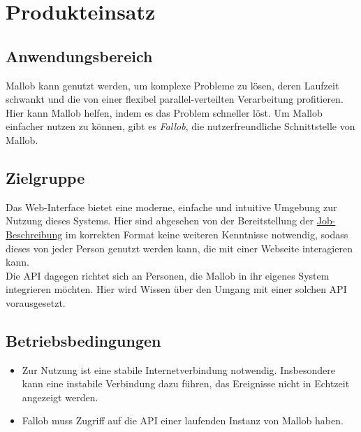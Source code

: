\section{Produkteinsatz}

\subsection{Anwendungsbereich}

\gls{Mallob} kann genutzt werden, um komplexe Probleme zu lösen, deren Laufzeit schwankt und die von einer flexibel parallel-verteilten Verarbeitung profitieren. Hier kann \gls{Mallob} helfen, indem es das Problem schneller löst. Um \gls{Mallob} einfacher nutzen zu können, gibt es \textit{Fallob}, die nutzerfreundliche Schnittstelle von \gls{Mallob}.

\subsection{Zielgruppe}

Das \gls{Web-Interface} bietet eine moderne, einfache und intuitive Umgebung zur Nutzung dieses Systems. Hier sind abgesehen von der Bereitstellung der \hyperref[B:Job-Beschreibung]{Job-Beschreibung} im korrekten Format keine weiteren Kenntnisse notwendig, sodass dieses von jeder Person genutzt werden kann, die mit einer Webseite interagieren  kann.\\
Die \gls{API} dagegen richtet sich an Personen, die \gls{Mallob} in ihr eigenes System integrieren möchten. Hier wird Wissen über den Umgang mit einer solchen \gls{API} vorausgesetzt.

\subsection{Betriebsbedingungen}
\begin{itemize}
    \item Zur Nutzung ist eine stabile Internetverbindung notwendig. Insbesondere kann eine instabile Verbindung dazu führen, das Ereignisse nicht in Echtzeit angezeigt werden.
    
    \item Fallob muss Zugriff auf die \gls{API} einer laufenden Instanz von \gls{Mallob} haben.
\end{itemize}